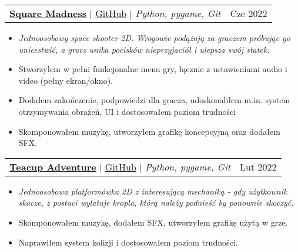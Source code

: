 \documentclass[letterpaper,11pt]{article}
\makeatletter
\newcommand{\resumeItem}[1]{
  \item\small{
    {#1 \vspace{-2pt}}
  }
}
\newcommand{\resumeProjectHeading}[2]{
    \item
    \begin{tabular*}{0.97\textwidth}{l@{\extracolsep{\fill}}r}
      \small#1 & #2 \\
    \end{tabular*}\vspace{-6pt}
}
\newcommand{\resumeItemListStart}{\begin{itemize}}
\newcommand{\resumeItemListEnd}{\end{itemize}\vspace{-5pt}}
\makeatother
\begin{document}
      \resumeProjectHeading
          {\textbf {\href{https:jirafey.itch.io/square-madness}
    {\underline{Square Madness}}} $|$ {\href{https://github.com/jirafey/square-madness}
    {\underline{GitHub}}}  $|$ \emph{Python, pygame, Git}}{Cze 2022}
          \resumeItemListStart
            \resumeItem{\emph{Jednoosobowy space shooter 2D. Wrogowie podążają za graczem próbując go unicestwić, a gracz unika pocisków nieprzyjaciół i ulepsza swój statek.}}
            \resumeItem{Stworzyłem w pełni funkcjonalne menu gry, łącznie z ustawieniami audio i video (pełny ekran/okno).}
            \resumeItem{Dodałem zakończenie, podpowiedzi dla gracza, udoskonaliłem m.in. system otrzymywania obrażeń, UI i dostosowałem poziom trudności}
            \resumeItem{Skomponowałem muzykę, utworzyłem grafikę koncepcyjną oraz dodałem SFX.}
          \resumeItemListEnd
      \resumeProjectHeading
                {\textbf {\href{https:jirafey.itch.io/teacup-adventure}
    {\underline{Teacup Adventure}}} $|$ {\href{https://github.com/jirafey/teacup-adventure}
    {\underline{GitHub}}} $|$ \emph{Python, pygame, Git}}{Lut 2022}
      \resumeItemListStart
        \resumeItem{\emph{Jednoosobowa platformówka 2D z interesującą mechaniką - gdy użytkownik skacze, z postaci wylatuje kropla, którą należy podnieść by ponownie skoczyć.}}
        \resumeItem{Skomponowałem muzykę, dodałem SFX, utworzyłem grafikę użytą w grze.}

        \resumeItem{Naprawiłem system kolizji i dostosowałem poziom trudności.}
      \resumeItemListEnd

        
\end{document}

